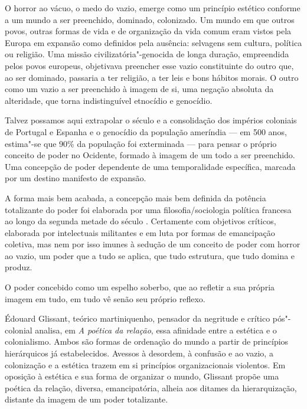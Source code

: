 O horror ao vácuo, o medo do vazio, emerge como um princípio estético
conforme a um mundo a ser preenchido, dominado, colonizado. Um mundo em
que outros povos, outras formas de vida e de organização da vida comum
eram vistos pela Europa em expansão como definidos pela ausência:
selvagens sem cultura, política ou religião. Uma missão
civilizatória"-genocida de longa duração, empreendida pelos povos
europeus, objetivava preencher esse vazio constituinte do outro que, ao
ser dominado, passaria a ter religião, a ter leis e bons hábitos morais.
O outro como um vazio a ser preenchido à imagem de si, uma negação
absoluta da alteridade, que torna indistinguível etnocídio e genocídio.

Talvez possamos aqui extrapolar o século  e a consolidação dos
impérios coloniais de Portugal e Espanha e o genocídio da população
ameríndia --- em 500 anos, estima"-se que 90\% da população foi exterminada
--- para pensar o próprio conceito de poder no Ocidente, formado à imagem
de um todo a ser preenchido. Uma concepção de poder dependente de uma
temporalidade específica, marcada por um destino manifesto de expansão.

A forma mais bem acabada, a concepção mais bem definida da potência
totalizante do poder foi elaborada por uma filosofia/sociologia
política francesa ao longo da segunda metade do século . Certamente
com objetivos críticos, elaborada por intelectuais militantes e em luta
por formas de emancipação coletiva, mas nem por isso imunes à sedução de
um conceito de poder com horror ao vazio, um poder que a tudo se aplica,
que tudo estrutura, que tudo domina e produz.

O poder concebido como um espelho soberbo, que ao refletir a sua própria
imagem em tudo, em tudo vê senão seu próprio reflexo.

\asterisc

Édouard Glissant, teórico martiniquenho, pensador da negritude e crítico
pós"-colonial analisa, em \emph{A poética da relação}, essa afinidade
entre a estética e o colonialismo. Ambos são formas de ordenação do
mundo a partir de princípios hierárquicos já estabelecidos. Avessos à
desordem, à confusão e ao vazio, a colonização e a estética trazem em si
princípios organizacionais violentos. Em oposição à estética e sua forma
de organizar o mundo, Glissant propõe uma poética da relação, diversa,
emancipatória, alheia aos ditames da hierarquização, distante da imagem
de um poder totalizante.

\asterisc

